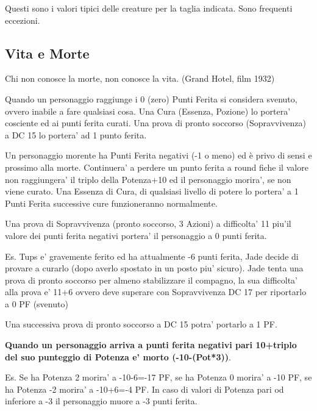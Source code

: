 \documentclass[a4paper,11pt,twoside,openany]{book}
\begin{document}
\smallskip
Questi sono i valori tipici delle creature per la taglia indicata.
Sono frequenti eccezioni.
\bigskip

\pagebreak

\subsection{Vita e Morte}

\label{vita-e-morte}
\begin{tcolorbox}[enhanced,arc=5pt,boxrule=0.3pt]{Chi non conosce la morte, non conosce la vita. (Grand Hotel, film 1932)}\end{tcolorbox}\medskip

Quando un personaggio raggiunge i 0 (zero) Punti Ferita si considera svenuto, ovvero inabile a fare qualsiasi cosa. Una Cura (Essenza, Pozione) lo portera’ cosciente ed ai punti ferita curati. Una prova di pronto soccorso (Sopravvivenza) a DC 15 lo portera’ ad 1 punto ferita.

Un personaggio morente ha Punti Ferita negativi (-1 o meno) ed è privo di sensi e prossimo alla morte. Continuera’ a perdere un punto ferita a round fiche il valore non raggiungera’ il triplo della Potenza+10 ed il personaggio morira’, se non viene curato.
Una Essenza di Cura, di qualsiasi livello di potere lo portera’ a 1 Punti Ferita successive cure funzioneranno normalmente.

Una prova di Sopravvivenza (pronto soccorso, 3 Azioni) a difficolta’ 11 piu’il valore dei punti ferita negativi portera’ il personaggio a 0 punti ferita.\\

\begin{tcolorbox}[title = Tups sta morendo] 
Es. Tups e’ gravemente ferito ed ha attualmente -6 punti ferita, Jade decide di provare a curarlo (dopo averlo spostato in un posto piu’ sicuro). Jade tenta una prova di pronto soccorso per almeno stabilizzare il compagno, la sua difficolta’ alla prova e’ 11+6 ovvero deve superare con Sopravvivenza DC 17 per riportarlo a 0 PF (svenuto)

Una successiva prova di pronto soccorso a DC 15 potra' portarlo a 1 PF.
\end{tcolorbox}


\textbf{Quando un personaggio arriva a punti ferita negativi pari 10+triplo del suo punteggio di Potenza e’ morto (-10-(Pot*3))}.

Es. Se ha Potenza 2 morira’ a -10-6=-17 PF, se ha Potenza 0 morira’ a -10 PF, se ha Potenza -2 morira’ a -10+6=-4 PF. In caso di valori di Potenza pari od inferiore a -3 il personaggio muore a -3 punti ferita.
\end{document}
